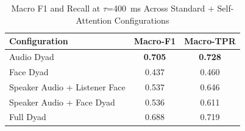 \begin{table}[h]
\caption{Macro F1 and Recall at $\tau$=400~ms Across Standard + Self-Attention Configurations}
\label{tab:macro_ssa}
\small
\renewcommand{\arraystretch}{1.20}
\begin{tabular}{>{\raggedright\arraybackslash}p{4cm}cc}
\toprule
Configuration & Macro-F1 & Macro-TPR \\
\midrule
Audio Dyad & \textbf{0.705} & \textbf{0.728} \\
Face Dyad & 0.437 & 0.460 \\
Speaker Audio + Listener Face & 0.537 & 0.646 \\
Speaker Audio + Face Dyad & 0.536 & 0.611 \\
Full Dyad & 0.688 & 0.719 \\
\bottomrule
\end{tabular}
\end{table}
